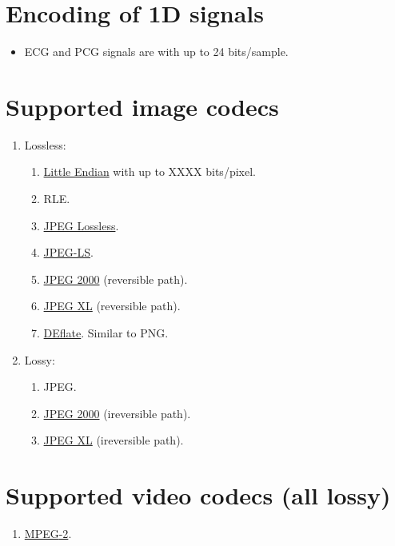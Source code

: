 \section{Encoding of 1D signals}
\begin{itemize}
\item \gls{ECG} and \gls{PCG} signals are  with up to 24
  bits/sample.
\end{itemize}

\section{Supported image codecs}
\begin{enumerate}
\item Lossless:
  \begin{enumerate}
  \item {}
    \href{https://en.wikipedia.org/wiki/Endianness}{Little Endian} with
    up to XXXX bits/pixel.
  \item \gls{RLE}.
  \item \href{https://en.wikipedia.org/wiki/Lossless_JPEG}{JPEG Lossless}.
  \item \href{https://en.wikipedia.org/wiki/Lossless_JPEG\#JPEG_LS}{JPEG-LS}.
  \item \href{https://en.wikipedia.org/wiki/JPEG_2000}{JPEG 2000}
    (reversible path).
  \item \href{https://en.wikipedia.org/wiki/JPEG_XL}{JPEG XL}
    (reversible path).
  \item \href{https://en.wikipedia.org/wiki/Deflate}{DEflate}. Similar
    to \gls{PNG}.
  \end{enumerate}
\item Lossy:
  \begin{enumerate}
  \item \gls{JPEG}.
  \item \href{https://en.wikipedia.org/wiki/JPEG_2000}{JPEG 2000}
    (ireversible path).
  \item \href{https://en.wikipedia.org/wiki/JPEG_XL}{JPEG XL}
    (ireversible path).
  \end{enumerate}
\end{enumerate}

\section{Supported video codecs (all lossy)}
\begin{enumerate}
\item \href{https://en.wikipedia.org/wiki/MPEG-2}{\gls{MPEG}-2}.
\end{enumerate}
  
